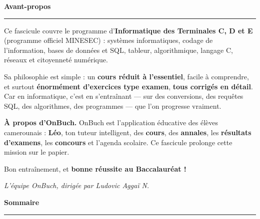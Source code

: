 





\frontmatter

\thispagestyle{empty}
\vspace*{0.6cm}
{\sffamily\fontsize{30}{32}\selectfont\bfseries\color{onbink} Avant-propos}\par\vspace{4pt}
{\color{onbo}\rule{5cm}{2.5pt}}\par\vspace{16pt}

\noindent Ce fascicule couvre le programme d'\textbf{Informatique des Terminales C, D
et E} (programme officiel MINESEC) : systèmes informatiques, codage de l'information,
bases de données et SQL, tableur, algorithmique, langage C, réseaux et citoyenneté
numérique.

\medskip
\noindent Sa philosophie est simple : un \textbf{cours réduit à l'essentiel}, facile à
comprendre, et surtout \textbf{énormément d'exercices type examen}, \textbf{tous
corrigés en détail}. Car en informatique, c'est en s'entraînant — sur des conversions,
des requêtes SQL, des algorithmes, des programmes — que l'on progresse vraiment.

\vspace{6pt}
\begin{aretenir}
\textbf{À propos d'OnBuch.} OnBuch est l'application éducative des élèves camerounais :
\textbf{Léo}, ton tuteur intelligent, des \textbf{cours}, des \textbf{annales}, les
\textbf{résultats d'examens}, les \textbf{concours} et l'agenda scolaire. Ce fascicule
prolonge cette mission sur le papier.
\end{aretenir}

\medskip
\noindent Bon entraînement, et \textbf{bonne réussite au Baccalauréat !}
\par\vspace{8pt}
\hfill{\sffamily\itshape\color{onbmuted} L'équipe OnBuch, dirigée par Ludovic Aggaï N.}
\clearpage

\thispagestyle{empty}
\vspace*{0.6cm}
{\sffamily\fontsize{30}{32}\selectfont\bfseries\color{onbink} Sommaire}\par\vspace{4pt}
{\color{onbo}\rule{5cm}{2.5pt}}\par\vspace{10pt}
{\hypersetup{linkcolor=onbink}\makeatletter{}\makeatother}

\mainmatter














